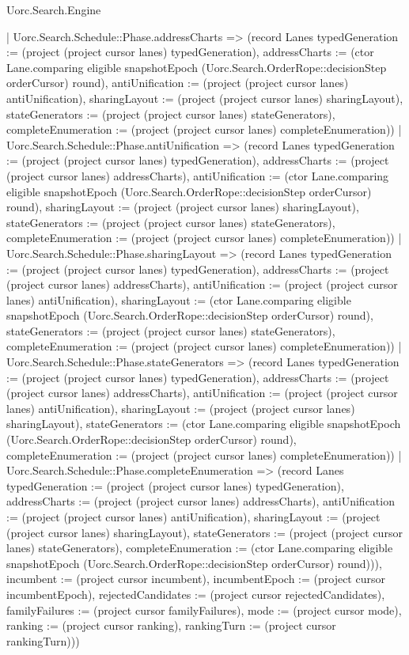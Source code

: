 \begin{lexlean}{Uorc.Search.Engine}
\begin{semanticmodule}
{{        | Uorc.Search.Schedule::Phase.addressCharts => (record Lanes {typedGeneration := (project (project cursor lanes) typedGeneration), addressCharts := (ctor Lane.comparing eligible snapshotEpoch (Uorc.Search.OrderRope::decisionStep orderCursor) round), antiUnification := (project (project cursor lanes) antiUnification), sharingLayout := (project (project cursor lanes) sharingLayout), stateGenerators := (project (project cursor lanes) stateGenerators), completeEnumeration := (project (project cursor lanes) completeEnumeration)})
        | Uorc.Search.Schedule::Phase.antiUnification => (record Lanes {typedGeneration := (project (project cursor lanes) typedGeneration), addressCharts := (project (project cursor lanes) addressCharts), antiUnification := (ctor Lane.comparing eligible snapshotEpoch (Uorc.Search.OrderRope::decisionStep orderCursor) round), sharingLayout := (project (project cursor lanes) sharingLayout), stateGenerators := (project (project cursor lanes) stateGenerators), completeEnumeration := (project (project cursor lanes) completeEnumeration)})
        | Uorc.Search.Schedule::Phase.sharingLayout => (record Lanes {typedGeneration := (project (project cursor lanes) typedGeneration), addressCharts := (project (project cursor lanes) addressCharts), antiUnification := (project (project cursor lanes) antiUnification), sharingLayout := (ctor Lane.comparing eligible snapshotEpoch (Uorc.Search.OrderRope::decisionStep orderCursor) round), stateGenerators := (project (project cursor lanes) stateGenerators), completeEnumeration := (project (project cursor lanes) completeEnumeration)})
        | Uorc.Search.Schedule::Phase.stateGenerators => (record Lanes {typedGeneration := (project (project cursor lanes) typedGeneration), addressCharts := (project (project cursor lanes) addressCharts), antiUnification := (project (project cursor lanes) antiUnification), sharingLayout := (project (project cursor lanes) sharingLayout), stateGenerators := (ctor Lane.comparing eligible snapshotEpoch (Uorc.Search.OrderRope::decisionStep orderCursor) round), completeEnumeration := (project (project cursor lanes) completeEnumeration)})
        | Uorc.Search.Schedule::Phase.completeEnumeration => (record Lanes {typedGeneration := (project (project cursor lanes) typedGeneration), addressCharts := (project (project cursor lanes) addressCharts), antiUnification := (project (project cursor lanes) antiUnification), sharingLayout := (project (project cursor lanes) sharingLayout), stateGenerators := (project (project cursor lanes) stateGenerators), completeEnumeration := (ctor Lane.comparing eligible snapshotEpoch (Uorc.Search.OrderRope::decisionStep orderCursor) round)})), incumbent := (project cursor incumbent), incumbentEpoch := (project cursor incumbentEpoch), rejectedCandidates := (project cursor rejectedCandidates), familyFailures := (project cursor familyFailures), mode := (project cursor mode), ranking := (project cursor ranking), rankingTurn := (project cursor rankingTurn)}))
}
\end{semanticmodule}
\end{lexlean}

